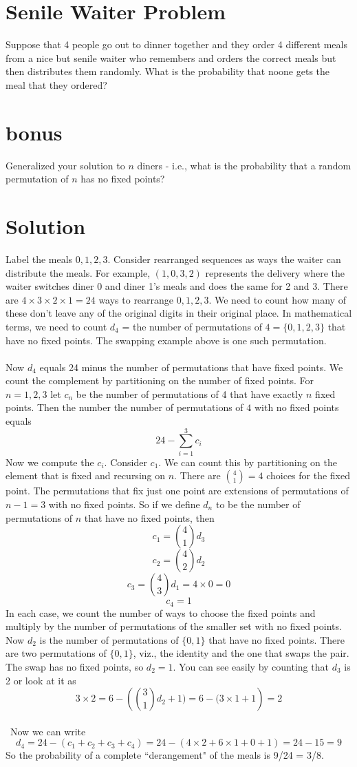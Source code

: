 \documentclass[11pt,a4paper]{report}
\theoremstyle{plain}
\theoremstyle{definition}
\theoremstyle{remark}
\begin{document}
\section*{Senile Waiter Problem}
Suppose that 4 people go out to dinner together and they order 4 different meals from a nice but senile waiter who remembers and orders the correct meals but then distributes them randomly.  What is the probability that noone gets the meal that they ordered?

\section*{bonus}
Generalized your solution to $n$ diners - i.e., what is the probability that a random permutation of $n$ has no fixed points?

\newpage
\section*{Solution}
Label the meals $0,1,2,3$.  Consider rearranged sequences as ways the waiter can distribute the meals.  For example, $(1,0,3,2)$ represents the delivery where the waiter switches diner 0 and diner 1's meals and does the same for 2 and 3.  There are $4\times3\times2\times1= 24$ ways to rearrange $0,1,2,3$.  We need to count how many of these don't leave any of the original digits in their original place.  In mathematical terms, we need to count $d_4$ = the number of permutations of $4 = \{0, 1, 2, 3\}$ that have no fixed points.  The swapping example above is one such permutation. 
\\\\
Now $d_4$ equals  24 minus the number of permutations that have fixed points. We count the complement by partitioning on the number of fixed points.  For $n = 1, 2, 3$ let $c_n$ be the number of permutations of 4 that have exactly $n$ fixed points.  Then the number the number of permutations of $4$ with no fixed points equals $$ 24 - \sum_{i=1}^{3}{c_i}$$
Now we compute the $c_i$.  Consider $c_{1}$.  We can count this by partitioning on the element that is fixed and recursing on $n$.  There are $ \binom{4}{1} = 4$ choices for the fixed point.  The permutations that fix just one point are extensions of permutations of $n - 1 = 3$ with no fixed points.  So if we define $d_n$ to be the number of permutations of $n$ that have no fixed points, then 
$$c_{1} =  \binom{4}{1} d_{3}$$
$$c_{2} = \binom{4}{2} d_{2}$$
$$c_{3} = \binom{4}{3} d_{1} = 4 \times 0 = 0$$
$$c_{4} = 1$$
In each case, we count the number of ways to choose the fixed points and multiply by the number of permutations of the smaller set with no fixed points.  Now $d_{2}$ is the number of permutations of $\{0,1\}$ that have no fixed points.  There are two permutations of  $\{0,1\}$, viz., the identity and the one that swaps the pair.  The swap has no fixed points, so $d_{2} = 1$.  You can see easily by counting that $d_{3}$ is 2 or look at it as $$3\times2 =6 - ({\binom{3}{1} d_{2}+ 1) =  6 -({3} \times{1}+ 1} ) = 2$$
\\\
Now we can write $$d_4 = 24 - (c_1 + c_2 + c_3 + c_4) = 24 - (4 \times 2 + 6 \times 1 + 0 +  1) = 24 - 15 = 9$$
So the probability of a complete ``derangement" of the meals is 9/24 = 3/8.
\end{document}
